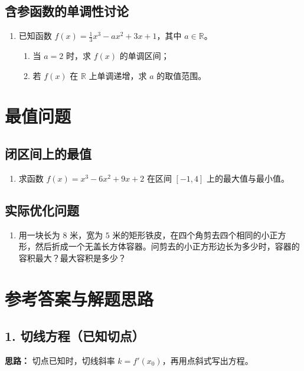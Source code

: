 \documentclass[10pt]{article}
\begin{document}
\subsection{含参函数的单调性讨论}
\begin{enumerate}[label=\arabic*., resume]
    \item 已知函数 $f(x) = \frac{1}{3}x^3 - ax^2 + 3x + 1$，其中 $a \in \mathbb{R}$。
    \begin{enumerate}
        \item 当 $a=2$ 时，求 $f(x)$ 的单调区间；
        \item 若 $f(x)$ 在 $\mathbb{R}$ 上单调递增，求 $a$ 的取值范围。
    \end{enumerate}
\end{enumerate}

\section{最值问题}
\subsection{闭区间上的最值}
\begin{enumerate}[label=\arabic*., resume]
    \item 求函数 $f(x) = x^3 - 6x^2 + 9x + 2$ 在区间 $[-1, 4]$ 上的最大值与最小值。
\end{enumerate}

\subsection{实际优化问题}
\begin{enumerate}[label=\arabic*., resume]
    \item 用一块长为 $8$ 米，宽为 $5$ 米的矩形铁皮，在四个角剪去四个相同的小正方形，然后折成一个无盖长方体容器。问剪去的小正方形边长为多少时，容器的容积最大？最大容积是多少？
\end{enumerate}

\section*{参考答案与解题思路}

\subsection*{1. 切线方程（已知切点）}
\textbf{思路：} 切点已知时，切线斜率 $k = f'(x_0)$，再用点斜式写出方程。
\end{document}
